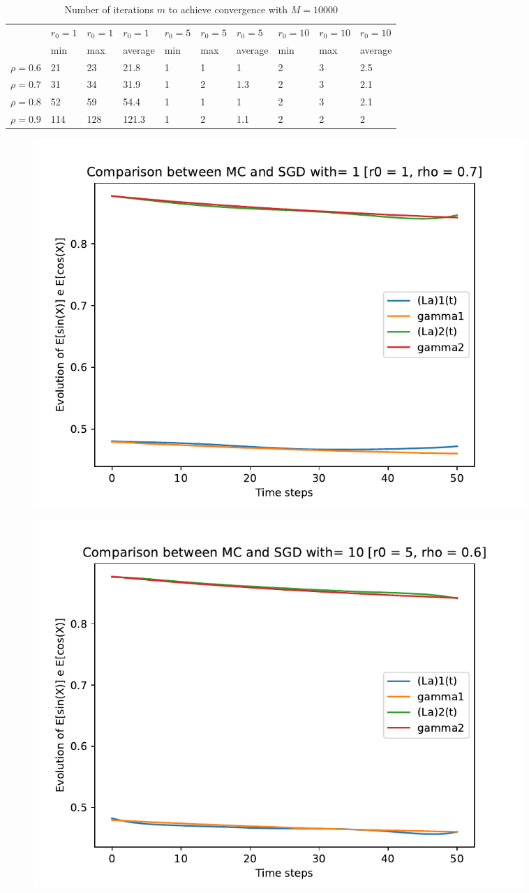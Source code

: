 \documentclass[a4paper,11pt,openright]{report}
\begin{document}
\begin{table}[H]
\centering
\addtolength{\leftskip}{-1.5cm}
\addtolength{\rightskip}{-1.5cm}
\begin{tabular}{|c|lllllllll|}
\hline
$ $ & $r_0 = 1$ & $r_0 = 1$ & $r_0 = 1$ & $r_0 = 5$ & $r_0 = 5$ & $r_0 = 5$ & $r_0 = 10$ & $r_0 = 10$ & $r_0 = 10$  \\
$ $ & min & max & average & min & max & average & min & max & average \\ 
\hline
$\rho = 0.6$ & 21 & 23 & 21.8 & 1 & 1 & 1 & 2 & 3 & 2.5\\

$\rho = 0.7$ & 31 & 34 & 31.9 & 1 & 2 & 1.3 & 2 & 3 & 2.1\\

$\rho = 0.8$ & 52 & 59 & 54.4 & 1 & 1 & 1 & 2 & 3 & 2.1\\

$\rho = 0.9$ & 114 & 128 & 121.3 & 1 & 2 & 1.1 & 2 & 2 & 2\\
\hline
\end{tabular}
\caption{Number of iterations $m$ to achieve convergence with $M = 10000$}
\end{table}
\begin{figure}[H]
\centering
\includegraphics[width=0.9\textwidth]{images/graphs T = 0.5/n = 6, M = 1 sine and cosine.pdf}
\end{figure}
\begin{figure}[H]
\centering
\includegraphics[width=0.9\textwidth]{images/graphs T = 0.5/n = 6, M = 10 sine and cosine.pdf}
\end{figure}
\end{document}
